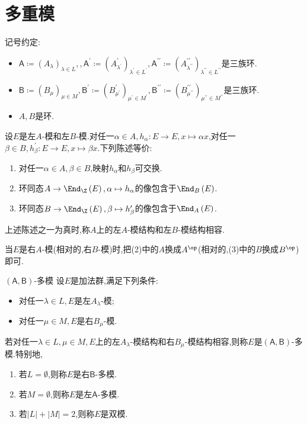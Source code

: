 \section{多重模}

记号约定:
\begin{itemize}
	\item $\mathsf{A}\coloneq\left(A_{\lambda}\right)_{\lambda\in L},,\mathsf{A}^{\prime}\coloneq\left(A_{\lambda^{\prime}}^{\prime}\right)_{\lambda^{\prime}\in L^{\prime}},\mathsf{A}^{\prime\prime}\coloneq\left(A_{\lambda^{\prime\prime}}^{\prime\prime}\right)_{\lambda^{\prime\prime}\in L^{\prime\prime}}$是三族环.
	\item $\mathsf{B}\coloneq\left(B_{\mu}\right)_{\mu\in M},\mathsf{B}^{\prime}\coloneq\left(B_{\mu^{\prime}}^{\prime}\right)_{\mu^{\prime}\in M^{\prime}},\mathsf{B}^{\prime\prime}\coloneq\left(B_{\mu^{\prime\prime}}^{\prime\prime}\right)_{\mu^{\prime\prime}\in M^{\prime\prime}}$是三族环.
	\item $A,B$是环.
\end{itemize}

\begin{definition}{}{}
	设$E$是左$A$-模和左$B$-模.对任一$\alpha\in A,h_{\alpha}:E\to E,x\mapsto\alpha x$,对任一$\beta\in B,h_{\beta}^{\prime}:E\to E,x\mapsto\beta x$.下列陈述等价:
	\begin{enumerate}
		\item 对任一$\alpha\in A,\beta\in B$,映射$h_{\alpha}$和$h_{\beta}$可交换.
		\item 环同态$A\to\End_{\Z}\left(E\right),\alpha\mapsto h_{\alpha}$的像包含于$\End_{B}\left(E\right)$.
		\item 环同态$B\to\End_{\Z}\left(E\right),\beta\mapsto h_{\beta}^{\prime}$的像包含于$\End_{A}\left(E\right)$.
	\end{enumerate}
	上述陈述之一为真时,称$A$上的左$A$-模结构和左$B$-模结构相容.
\end{definition}

\begin{remark}{}{}
	当$E$是右$A$-模(相对的,右$B$-模)时,把(2)中的$A$换成$A^{\op}$(相对的,(3)中的$B$换成$B^{\op}$)即可.
\end{remark}

\begin{definition}{$\left(\mathsf{A},\mathsf{B}\right)$-多模}{}
	设$E$是加法群,满足下列条件:
	\begin{itemize}
		\item 对任一$\lambda\in L,E$是左$A_{\lambda}$-模;
		\item 对任一$\mu\in M,E$是右$B_{\mu}$-模.
	\end{itemize}
	若对任一$\lambda\in L,\mu\in M,E$上的左$A_{\lambda}$-模结构和右$B_{\mu}$-模结构相容,则称$E$是$\left(\mathsf{A},\mathsf{B}\right)$-多模.特别地,
	\begin{enumerate}
		\item 若$L=\emptyset$,则称$E$是右$\mathsf{B}$-多模.
		\item 若$M=\emptyset$,则称$E$是左$\mathsf{A}$-多模.
		\item 若$\left|L\right|+\left|M\right|=2$,则称$E$是双模.
	\end{enumerate}
\end{definition}

